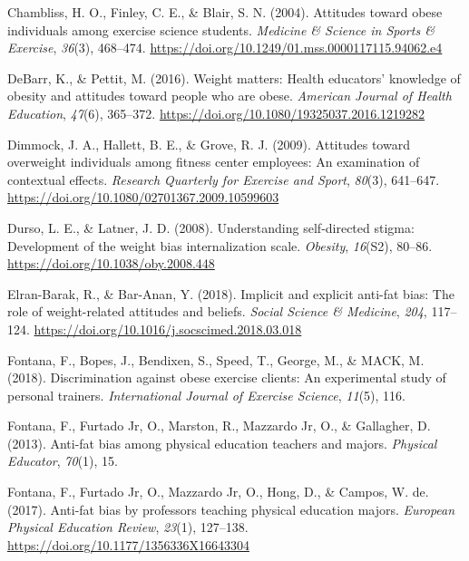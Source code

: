 \documentclass[
  jou,
  longtable,
  nolmodern,
  notxfonts,
  notimes,
  colorlinks=true,linkcolor=blue,citecolor=blue,urlcolor=blue]{apa7}
\newlength{\cslhangindent}
\newenvironment{CSLReferences}[2] %
 {\begin{list}{}{%
  \setlength{\itemindent}{0pt}
  \setlength{\leftmargin}{0pt}
  \setlength{\parsep}{0pt}
  \ifodd #1
   \setlength{\leftmargin}{\cslhangindent}
   \setlength{\itemindent}{-1\cslhangindent}
  \fi
  \setlength{\itemsep}{#2\baselineskip}}}
 {\end{list}}
\begin{document}
\label{refs}
\begin{CSLReferences}{1}{0}
Chambliss, H. O., Finley, C. E., \& Blair, S. N. (2004). Attitudes
toward obese individuals among exercise science students. \emph{Medicine
\& Science in Sports \& Exercise}, \emph{36}(3), 468--474.
\url{https://doi.org/10.1249/01.mss.0000117115.94062.e4}

DeBarr, K., \& Pettit, M. (2016). Weight matters: Health educators'
knowledge of obesity and attitudes toward people who are obese.
\emph{American Journal of Health Education}, \emph{47}(6), 365--372.
\url{https://doi.org/10.1080/19325037.2016.1219282}

Dimmock, J. A., Hallett, B. E., \& Grove, R. J. (2009). Attitudes toward
overweight individuals among fitness center employees: An examination of
contextual effects. \emph{Research Quarterly for Exercise and Sport},
\emph{80}(3), 641--647.
\url{https://doi.org/10.1080/02701367.2009.10599603}

Durso, L. E., \& Latner, J. D. (2008). Understanding self‐directed
stigma: Development of the weight bias internalization scale.
\emph{Obesity}, \emph{16}(S2), 80--86.
\url{https://doi.org/10.1038/oby.2008.448}

Elran-Barak, R., \& Bar-Anan, Y. (2018). Implicit and explicit anti-fat
bias: The role of weight-related attitudes and beliefs. \emph{Social
Science \& Medicine}, \emph{204}, 117--124.
\url{https://doi.org/10.1016/j.socscimed.2018.03.018}

Fontana, F., Bopes, J., Bendixen, S., Speed, T., George, M., \& MACK, M.
(2018). Discrimination against obese exercise clients: An experimental
study of personal trainers. \emph{International Journal of Exercise
Science}, \emph{11}(5), 116.

Fontana, F., Furtado Jr, O., Marston, R., Mazzardo Jr, O., \& Gallagher,
D. (2013). Anti-fat bias among physical education teachers and majors.
\emph{Physical Educator}, \emph{70}(1), 15.

Fontana, F., Furtado Jr, O., Mazzardo Jr, O., Hong, D., \& Campos, W.
de. (2017). Anti-fat bias by professors teaching physical education
majors. \emph{European Physical Education Review}, \emph{23}(1),
127--138. \url{https://doi.org/10.1177/1356336X16643304}


\end{CSLReferences}
\end{document}
